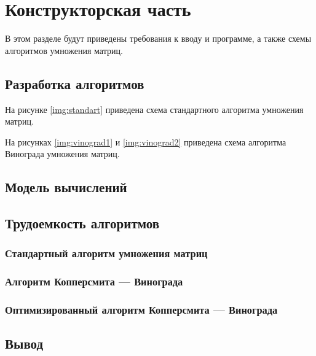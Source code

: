\chapter{Конструкторская часть}
В этом разделе будут приведены требования к вводу и программе, а также схемы алгоритмов умножения матриц.

\section{Разработка алгоритмов}

На рисунке \ref{img:standart} приведена схема стандартного алгоритма умножения матриц.

На рисунках \ref{img:vinograd1} и \ref{img:vinograd2} приведена схема алгоритма Винограда умножения матриц.










\section{Модель вычислений}

\section{Трудоемкость алгоритмов}

\subsection{Стандартный алгоритм умножения матриц}

\subsection{Алгоритм Копперсмита — Винограда}

\subsection{Оптимизированный алгоритм Копперсмита —
	Винограда}

\section*{Вывод}


